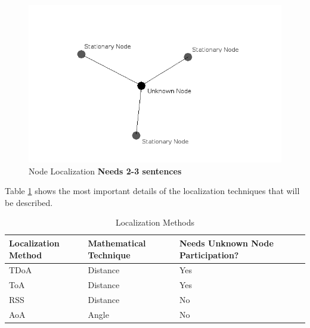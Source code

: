 \begin{figure}[ht]
\centering
\includegraphics[scale=0.5]{img/node-localization-lines.png}
\caption{Node Localization \textbf{Needs 2-3 sentences}}
\label{fig:node_localization}
\end{figure}\par

Table \ref{table:local_methods} shows the most important details of the localization techniques that will be described. \par
\begin{table}[ht]
\centering
\caption{Localization Methods}
\label{table:local_methods}
\begin{tabular}{|l|l|l|l|}
    \hline
  Localization Method   & Mathematical Technique    & Needs Unknown Node Participation? & \\ \hline
         TDoA           & Distance                  & Yes                               & \\
          ToA           & Distance                  & Yes                               & \\
          RSS           & Distance                  & No                                & \\
          AoA           & Angle                     & No                                & \\
    \hline
\end{tabular}
\end{table}\par

